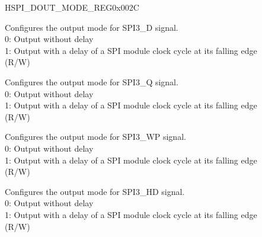 \begin{register}{H}{SPI\_DOUT\_MODE\_REG}{0x002C}\label{regdesc:SPI3DOUTMODEREG}
%
%
%
%
%
\regnewline%
\begin{regdesc}\begin{reglist}
\label{fielddesc:SPI3DOUT0MODE}\item [SPI\_DOUT0\_MODE] Configures the output mode for SPI3\_D signal.\\
0: Output without delay\\
1: Output with a delay of a SPI module clock cycle at its falling edge\\
(R/W)
\label{fielddesc:SPI3DOUT1MODE}\item [SPI\_DOUT1\_MODE] Configures the output mode for SPI3\_Q signal.\\
0: Output without delay\\
1: Output with a delay of a SPI module clock cycle at its falling edge\\
(R/W)
\label{fielddesc:SPI3DOUT2MODE}\item [SPI\_DOUT2\_MODE] Configures the output mode for SPI3\_WP signal.\\
0: Output without delay\\
1: Output with a delay of a SPI module clock cycle at its falling edge\\
(R/W)
\label{fielddesc:SPI3DOUT3MODE}\item [SPI\_DOUT3\_MODE] Configures the output mode for SPI3\_HD signal.\\
0: Output without delay\\
1: Output with a delay of a SPI module clock cycle at its falling edge\\
(R/W)
\end{reglist}\end{regdesc}
\end{register}


